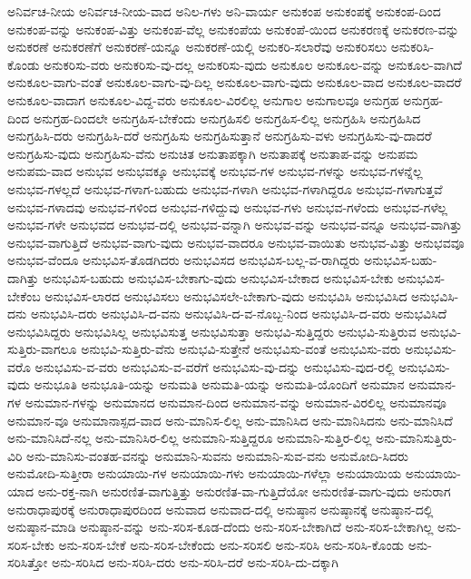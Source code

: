 {ಅನಿರ್ವಚ-ನೀಯ
ಅನಿರ್ವಚ-ನೀಯ-ವಾದ
ಅನಿಲ-ಗಳು
ಅನಿ-ವಾರ್ಯ
ಅನುಕಂಪ
ಅನುಕಂಪಕ್ಕೆ
ಅನುಕಂಪ-ದಿಂದ
ಅನುಕಂಪ-ವನ್ನು
ಅನುಕಂಪ-ವಿತ್ತು
ಅನುಕಂಪ-ವೆಲ್ಲ
ಅನುಕಂಪೆಯ
ಅನುಕಂಪೆ-ಯಿಂದ
ಅನುಕರಣಕ್ಕೆ
ಅನುಕರಣ-ವನ್ನು
ಅನುಕರಣೆ
ಅನುಕರಣೆಗೆ
ಅನುಕರಣೆ-ಯನ್ನೂ
ಅನುಕರಣೆ-ಯಲ್ಲಿ
ಅನುಕರಿ-ಸಲಾರೆವು
ಅನುಕರಿಸಲು
ಅನುಕರಿಸಿ-ಕೊಂಡು
ಅನುಕರಿಸು-ವರು
ಅನುಕರಿಸು-ವು-ದಲ್ಲ
ಅನುಕರಿಸು-ವುದು
ಅನುಕೂಲ
ಅನುಕೂಲ-ವನ್ನು
ಅನುಕೂಲ-ವಾಗಿದೆ
ಅನುಕೂಲ-ವಾಗು-ವಂತೆ
ಅನುಕೂಲ-ವಾಗು-ವು-ದಿಲ್ಲ
ಅನುಕೂಲ-ವಾಗು-ವುದು
ಅನುಕೂಲ-ವಾದ
ಅನುಕೂಲ-ವಾದರೆ
ಅನುಕೂಲ-ವಾದಾಗ
ಅನುಕೂಲ-ವಿದ್ದ-ವರು
ಅನುಕೂಲ-ವಿರಲಿಲ್ಲ
ಅನುಗಾಲ
ಅನುಗಾಲವೂ
ಅನುಗ್ರಹ
ಅನುಗ್ರಹ-ದಿಂದ
ಅನುಗ್ರಹ-ದಿಂದಲೇ
ಅನುಗ್ರಹಿಸ-ಬೇಕೆಂದು
ಅನುಗ್ರಹಿಸಲಿ
ಅನುಗ್ರಹಿಸ-ಲಿಲ್ಲ
ಅನುಗ್ರಹಿಸಿ
ಅನುಗ್ರಹಿಸಿದ
ಅನುಗ್ರಹಿಸಿ-ದರು
ಅನುಗ್ರಹಿಸಿ-ದರೆ
ಅನುಗ್ರಹಿಸು
ಅನುಗ್ರಹಿಸುತ್ತಾನೆ
ಅನುಗ್ರಹಿಸು-ವಳು
ಅನುಗ್ರಹಿಸು-ವು-ದಾದರೆ
ಅನುಗ್ರಹಿಸು-ವುದು
ಅನುಗ್ರಹಿಸು-ವೆನು
ಅನುಚಿತ
ಅನುತಾಪಕ್ಕಾಗಿ
ಅನುತಾಪಕ್ಕೆ
ಅನುತಾಪ-ವನ್ನು
ಅನುಪಮ
ಅನುಪಮ-ವಾದ
ಅನುಭವ
ಅನುಭವಕ್ಕೂ
ಅನುಭವಕ್ಕೆ
ಅನುಭವ-ಗಳ
ಅನುಭವ-ಗಳನ್ನು
ಅನುಭವ-ಗಳನ್ನೆಲ್ಲ
ಅನುಭವ-ಗಳಲ್ಲದೆ
ಅನುಭವ-ಗಳಾಗ-ಬಹುದು
ಅನುಭವ-ಗಳಾಗಿ
ಅನುಭವ-ಗಳಾಗಿದ್ದರೂ
ಅನುಭವ-ಗಳಾಗುತ್ತವೆ
ಅನುಭವ-ಗಳಾದವು
ಅನುಭವ-ಗಳಿಂದ
ಅನುಭವ-ಗಳಿದ್ದುವು
ಅನುಭವ-ಗಳು
ಅನುಭವ-ಗಳೆಂದು
ಅನುಭವ-ಗಳೆಲ್ಲ
ಅನುಭವ-ಗಳೇ
ಅನುಭವದ
ಅನುಭವ-ದಲ್ಲಿ
ಅನುಭವ-ವನ್ನಾಗಿ
ಅನುಭವ-ವನ್ನು
ಅನುಭವ-ವನ್ನೂ
ಅನುಭವ-ವಾಗಿತ್ತು
ಅನುಭವ-ವಾಗುತ್ತಿದೆ
ಅನುಭವ-ವಾಗು-ವುದು
ಅನುಭವ-ವಾದರೂ
ಅನುಭವ-ವಾಯಿತು
ಅನುಭವ-ವಿತ್ತು
ಅನುಭವವೂ
ಅನುಭವ-ವೆಂದೂ
ಅನುಭವಿಸ-ತೊಡಗಿದರು
ಅನುಭವಿಸದ
ಅನುಭವಿಸ-ಬಲ್ಲ-ವ-ರಾಗಿದ್ದರು
ಅನುಭವಿಸ-ಬಹು-ದಾಗಿತ್ತು
ಅನುಭವಿಸ-ಬಹುದು
ಅನುಭವಿಸ-ಬೇಕಾಗು-ವುದು
ಅನುಭವಿಸ-ಬೇಕಾದ
ಅನುಭವಿಸ-ಬೇಕು
ಅನುಭವಿಸ-ಬೇಕೆಂಬ
ಅನುಭವಿಸ-ಲಾರದ
ಅನುಭವಿಸಲು
ಅನುಭವಿಸಲೇ-ಬೇಕಾಗು-ವುದು
ಅನುಭವಿಸಿ
ಅನುಭವಿಸಿದ
ಅನುಭವಿಸಿ-ದನು
ಅನುಭವಿಸಿ-ದರು
ಅನುಭವಿಸಿ-ದ-ವನು
ಅನುಭವಿಸಿ-ದ-ವ-ನೊಬ್ಬ-ನಿಂದ
ಅನುಭವಿಸಿ-ದ-ವರು
ಅನುಭವಿಸಿದೆ
ಅನುಭವಿಸಿದ್ದರು
ಅನುಭವಿಸಿಲ್ಲ
ಅನುಭವಿಸುತ್ತ
ಅನುಭವಿಸುತ್ತಾ
ಅನುಭವಿ-ಸುತ್ತಿದ್ದರು
ಅನುಭವಿ-ಸುತ್ತಿರುವ
ಅನುಭವಿ-ಸುತ್ತಿರು-ವಾಗಲೂ
ಅನುಭವಿ-ಸುತ್ತಿರು-ವೆನು
ಅನುಭವಿ-ಸುತ್ತೇನೆ
ಅನುಭವಿಸು-ವಂತೆ
ಅನುಭವಿಸು-ವರು
ಅನುಭವಿಸು-ವರೊ
ಅನುಭವಿಸು-ವ-ವರು
ಅನುಭವಿಸು-ವ-ವರೆಗೆ
ಅನುಭವಿಸು-ವು-ದನ್ನು
ಅನುಭವಿಸು-ವುದ-ರಲ್ಲಿ
ಅನುಭವಿಸು-ವುದು
ಅನುಭೂತಿ
ಅನುಭೂತಿ-ಯನ್ನು
ಅನುಮತಿ
ಅನುಮತಿ-ಯನ್ನು
ಅನುಮತಿ-ಯೊಂದಿಗೆ
ಅನುಮಾನ
ಅನುಮಾನ-ಗಳ
ಅನುಮಾನ-ಗಳನ್ನು
ಅನುಮಾನದ
ಅನುಮಾನ-ದಿಂದ
ಅನುಮಾನ-ವನ್ನು
ಅನುಮಾನ-ವಿರಲಿಲ್ಲ
ಅನುಮಾನವೂ
ಅನುಮಾನ-ವೂ
ಅನುಮಾನಾಸ್ಪದ-ವಾದ
ಅನು-ಮಾನಿಸ-ಲಿಲ್ಲ
ಅನು-ಮಾನಿಸಿದ
ಅನು-ಮಾನಿಸಿದನು
ಅನು-ಮಾನಿಸಿದೆ
ಅನು-ಮಾನಿಸಿದೆ-ನಲ್ಲ
ಅನು-ಮಾನಿಸಿರ-ಲಿಲ್ಲ
ಅನುಮಾನಿ-ಸುತ್ತಿದ್ದರೂ
ಅನುಮಾನಿ-ಸುತ್ತಿರ-ಲಿಲ್ಲ
ಅನು-ಮಾನಿಸುತ್ತಿರು-ವಿರಿ
ಅನು-ಮಾನಿಸು-ವಂತಹ-ವನನ್ನು
ಅನುಮಾನಿ-ಸುವನು
ಅನುಮಾನಿ-ಸುವ-ವನು
ಅನುಮೋದಿ-ಸಿದರು
ಅನುಮೋದಿ-ಸುತ್ತೀರಾ
ಅನುಯಾಯಿ-ಗಳ
ಅನುಯಾಯಿ-ಗಳು
ಅನುಯಾಯಿ-ಗಳೆಲ್ಲಾ
ಅನುಯಾಯಿಯ
ಅನುಯಾಯಿ-ಯಾದ
ಅನು-ರಕ್ತ-ನಾಗಿ
ಅನುರಣಿತ-ವಾಗುತ್ತಿತ್ತು
ಅನುರಣಿತ-ವಾ-ಗುತ್ತಿದೆಯೋ
ಅನುರಣಿತ-ವಾಗು-ವುದು
ಅನುರಾಗ
ಅನುರಾಧಾಪುರಕ್ಕೆ
ಅನುರಾಧಾಪುರದಿಂದ
ಅನುವಾದ
ಅನುವಾದ-ದಲ್ಲಿ
ಅನುಷ್ಠಾನ
ಅನುಷ್ಠಾನಕ್ಕೆ
ಅನುಷ್ಠಾನ-ದಲ್ಲಿ
ಅನುಷ್ಠಾನ-ಮಾಡಿ
ಅನುಷ್ಠಾನ-ವನ್ನು
ಅನು-ಸರಿಸ-ಕೂಡ-ದೆಂದು
ಅನು-ಸರಿಸ-ಬೇಕಾಗಿದೆ
ಅನು-ಸರಿಸ-ಬೇಕಾಗಿಲ್ಲ
ಅನು-ಸರಿಸ-ಬೇಕು
ಅನು-ಸರಿಸ-ಬೇಕೆ
ಅನು-ಸರಿಸ-ಬೇಕೆಂದು
ಅನು-ಸರಿಸಲಿ
ಅನು-ಸರಿಸಿ
ಅನು-ಸರಿಸಿ-ಕೊಂಡು
ಅನು-ಸರಿಸಿತ್ತೋ
ಅನು-ಸರಿಸಿದ
ಅನು-ಸರಿಸಿ-ದರು
ಅನು-ಸರಿಸಿ-ದರೆ
ಅನು-ಸರಿಸಿ-ದು-ದಕ್ಕಾಗಿ
}
